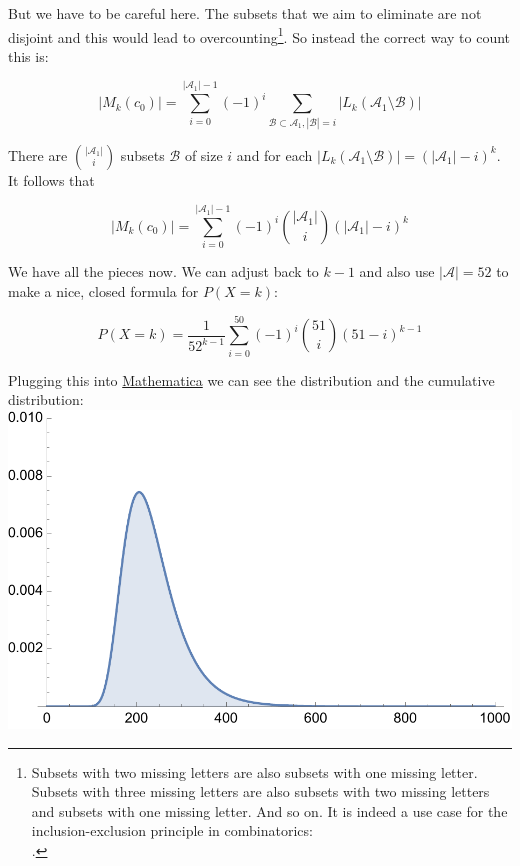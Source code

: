 But we have to be careful here. The subsets that we aim to eliminate are not disjoint and this would lead to overcounting\footnote{Subsets with two missing letters are also subsets with one missing letter. Subsets with three missing letters are also subsets with two missing letters and subsets with one missing letter. And so on. It is indeed a use case for the inclusion-exclusion principle in combinatorics: \\ .}. So instead the correct way to count this is:

$$
|M_k(c_0)| = \sum_{i = 0}^{|\mathcal{A}_1| - 1} (-1)^i \sum_{\mathcal{B} \subset \mathcal{A}_1, |\mathcal{B}|=i} |L_k(\mathcal{A}_1 \setminus \mathcal{B})|
$$

There are $\binom{|\mathcal{A}_1|}{i}$ subsets $\mathcal{B}$ of size $i$ and for each $|L_k(\mathcal{A}_1 \setminus \mathcal{B})| = (|\mathcal{A}_1| - i)^k$. It follows that

$$
|M_k(c_0)| = \sum_{i = 0}^{|\mathcal{A}_1| - 1} (-1)^i \binom{|\mathcal{A}_1|}{i} (|\mathcal{A}_1| - i)^k
$$

We have all the pieces now. We can adjust back to $k-1$ and also use $|\mathcal{A}|=52$ to make a nice, closed formula for $P(X=k)$:

$$
P(X=k) = \frac{1}{52^{k-1}} \sum_{i = 0}^{50} (-1)^i \binom{51}{i} (51 - i)^{k-1}
$$

Plugging this into \href{https://www.wolframcloud.com/obj/75d50b79-164a-4bed-a4b5-7592d2488169}{Mathematica} we can see the distribution and the cumulative distribution:\\


\includegraphics[scale=0.7]{probs.pdf}

